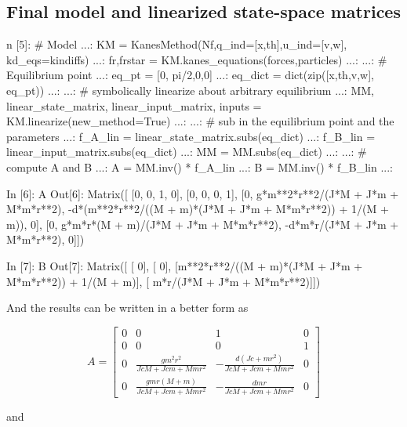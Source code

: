 \subsection{Final model and linearized state-space matrices}
\begin{code}
n [5]: # Model
   ...: KM = KanesMethod(Nf,q_ind=[x,th],u_ind=[v,w], kd_eqs=kindiffs)
   ...: fr,frstar = KM.kanes_equations(forces,particles)
   ...: 
   ...: # Equilibrium point
   ...: eq_pt = [0, pi/2,0,0]
   ...: eq_dict = dict(zip([x,th,v,w], eq_pt))
   ...: 
   ...: # symbolically linearize about arbitrary equilibrium
   ...: MM, linear_state_matrix, linear_input_matrix, inputs = 
KM.linearize(new_method=True)
   ...: 
   ...: # sub in the equilibrium point and the parameters
   ...: f_A_lin = linear_state_matrix.subs(eq_dict)
   ...: f_B_lin = linear_input_matrix.subs(eq_dict)
   ...: MM = MM.subs(eq_dict)
   ...: 
   ...: # compute A and B
   ...: A = MM.inv() * f_A_lin
   ...: B = MM.inv() * f_B_lin
   ...: 
\end{code}

\begin{code}
In [6]: A
Out[6]: 
Matrix([
[0,  0,  1, 0],
[0,  0,  0, 1],
[0,   g*m**2*r**2/(J*M + J*m + M*m*r**2), -d*(m**2*r**2/((M + m)*(J*M + J*m 
+ M*m*r**2)) + 1/(M + m)), 0],
[0, g*m*r*(M + m)/(J*M + J*m + M*m*r**2),                               
-d*m*r/(J*M + J*m + M*m*r**2), 0]])
\end{code}

\begin{code}
In [7]: B
Out[7]: 
Matrix([
[                                                       0],
[                                                       0],
[m**2*r**2/((M + m)*(J*M + J*m + M*m*r**2)) + 1/(M + m)],
[                            m*r/(J*M + J*m + M*m*r**2)]])
\end{code}

And the results can be written in a better form as

$$
A=\left[\begin{matrix}0 & 0 & 1 & 0\\0 & 0 & 0 & 1\\0 & \frac{g m^{2} r^{2}}{Jc 
M + Jc m + M m r^{2}} & - \frac{d \left(Jc + m r^{2}\right)}{Jc M + Jc m + M m 
r^{2}} & 0\\0 & \frac{g m r \left(M + m\right)}{Jc M + Jc m + M m r^{2}} & - 
\frac{d m r}{Jc M + Jc m + M m r^{2}} & 0\end{matrix}\right]
$$

and 

